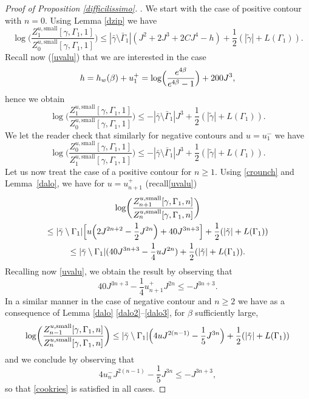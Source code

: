 \documentclass[JEP,XML,SOM,Unicode, NoFloatCountersInSection]{cedram}
\numberwithin{equation}{section}
\theoremstyle{plain}
\theoremstyle{definition}
\newcommand{\sm}{\mathrm{small}}
\newcommand{\gb}{\beta}
\newcommand{\gG}{\Gamma}
\begin{document}
\begin{proof}[Proof of Proposition \ref{difficilissimo}].
We start with the case of positive contour with $n=0$.
Using Lemma \ref{dzip} we have
\begin{equation*}
\log \biggl(\frac{ Z^{u,\sm}_{1}[\gamma,\Gamma_1,1]}{ Z^{u,\sm}_{0}[\gamma,\Gamma_1,1]}\biggr)
\le |\bar \gamma \setminus \bar \gG_1|(J^2+2J^3+2CJ^4-h)+ \frac 1 2\left(|\tilde \gamma|+L(\gG_1)\right).
\end{equation*}
Recall now (\cf \eqref{uvalu}) that we are interested in the case
\begin{equation*}
h=h_w(\gb)+u^+_1= \log\Bigl(\frac{ e^{4\gb} }{e^{4\gb}-1}\Bigr)+200J^3,
\end{equation*}
hence we obtain
\begin{equation*}
\log \biggl(\frac{ Z^{u,\sm}_{1}[\gamma,\Gamma_1,1]}{ Z^{u,\sm}_{0}[\gamma,\Gamma_1,1]}\biggr)
\le -|\bar \gamma \setminus \bar \gG_1| J^3+\frac 1 2 \left(|\tilde \gamma|+L(\gG_1)\right).
\end{equation*}
We let the reader check that similarly for negative contours and $u=u^-_1$ we have
\begin{equation*}
\log \biggl(\frac{ Z^{u,\sm}_{0}[\gamma,\Gamma_1,1]}{ Z^{u,\sm}_{1}[\gamma,\Gamma_1,1]}\biggr)
\le -|\bar \gamma \setminus \bar \gG_1| J^3+\frac{1}{2}\left(|\tilde \gamma|+L(\gG_1)\right).
\end{equation*}
Let us now treat the case of a positive contour for $n\ge 1$.
Using \eqref{crounch} and Lemma~\ref{dalo}, we have for $u=u^+_{n+1}$ (recall\eqref{uvalu})\vspace*{-5pt}%
\begin{multline*}
\log \biggl(\frac{ Z^{u,\sm}_{n+1}[\gamma,\Gamma_1,n]}{ Z^{u,\sm}_{n}[\gamma,\Gamma_1,n]}\biggr)\\
\le |\bar \gamma \setminus \Gamma_1|\Bigl[ u\Bigl(2J^{2n+2}- \frac{1}{2}J^{2n}\Bigr)+40J^{3n+3} \Bigr]+ \frac{1}{2}(|\tilde \gamma|+L(\gG_1))\\
\le |\bar \gamma \setminus \Gamma_1|(40J^{3n+3}-\frac{1}{4}u J^{2n})+ \frac{1}{2}(|\tilde \gamma|+L(\gG_1)).
\end{multline*}
Recalling now \eqref{uvalu},
we obtain the result by observing that
\begin{equation*}
40J^{3n+3}-\frac{1}{4}u^+_{n+1} J^{2n}\le -J^{3n+3}.
\end{equation*}
In a similar manner in the case of negative contour and $n\ge 2$ we have as a consequence of Lemma \ref{dalo} \eqref{dalo2}--\eqref{dalo3}, for $\gb$ sufficiently large,
\begin{equation*}
\log \biggl(\frac{ Z^{u,\sm}_{n-1}[\gamma,\Gamma_1,n]}{ Z^{u,\sm}_{n}[\gamma,\Gamma_1,n]}\biggr)
\le
|\bar \gamma \setminus \Gamma_1| \Bigl(4u J^{2(n-1)}-\frac{1}{5}J^{3n}\Bigr)+ \frac{1}{2}(|\tilde \gamma|+L(\gG_1))
\end{equation*}
and we conclude by observing that
\begin{equation*}
4u^-_n J^{2(n-1)}-\frac{1}{5}J^{3n}\le -J^{3n+3},
\end{equation*}
so that \eqref{cookries} is satisfied in all cases.
\end{proof}
\end{document}
